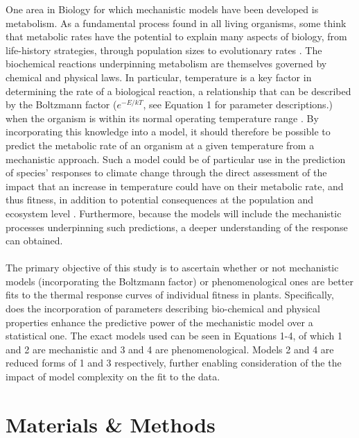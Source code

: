 \documentclass[11pt]{article}
\begin{document}
One area in Biology for which mechanistic models have been developed is metabolism. As a fundamental process found in all living organisms, some think that metabolic rates have the potential to explain many aspects of biology, from life-history strategies, through population sizes to evolutionary rates \cite{brown2004toward}. The biochemical reactions underpinning metabolism are themselves governed by chemical and physical laws. In particular, temperature is a key factor in determining the rate of a biological reaction, a relationship that can be described by the Boltzmann factor (\begin{math}e^{-E/kT}\end{math}, see Equation 1 for parameter descriptions.) when the organism is within its normal operating temperature range \cite{schoolfield1981non, gillooly2001effects}. By incorporating this knowledge into a model, it should therefore be possible to predict the metabolic rate of an organism at a given temperature from a mechanistic approach. Such a model could be of particular use in the prediction of species' responses to climate change through the direct assessment of the impact that an increase in temperature could have on their metabolic rate, and thus fitness, in addition to potential consequences at the population and ecosystem level \cite{thomas2012global, brown2004toward}. Furthermore, because the models will include the mechanistic processes underpinning such predictions, a deeper understanding of the response can obtained.
\\
\\
The primary objective of this study is to ascertain whether or not mechanistic models (incorporating the Boltzmann factor) or phenomenological ones are better fits to the thermal response curves of individual fitness in plants. Specifically, does the incorporation of parameters describing bio-chemical and physical properties enhance the predictive power of the mechanistic model over a statistical one. The exact models used can be seen in Equations 1-4, of which 1 and 2 are mechanistic and 3 and 4 are phenomenological. Models 2 and 4 are reduced forms of 1 and 3 respectively, further enabling  consideration of the the impact of model complexity on the fit to the data.
\section{Materials \& Methods}
\end{document}
